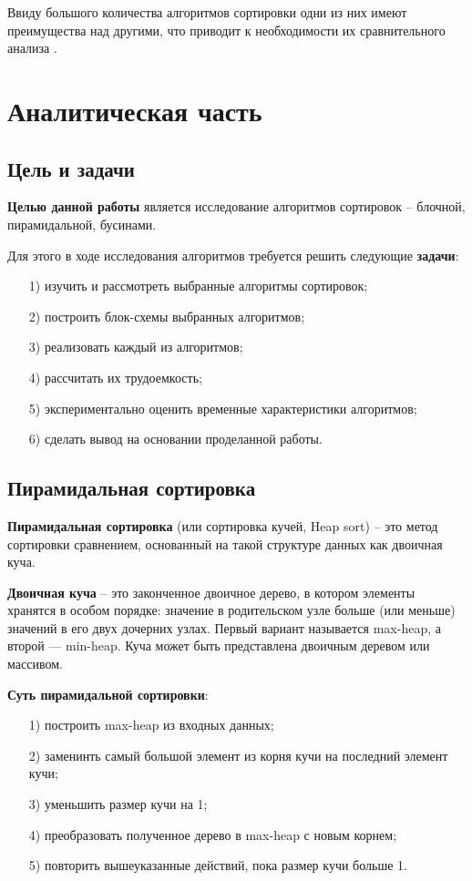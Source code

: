\documentclass[a4paper,14pt, unknownkeysallowed]{extreport}
\begin{document}
Ввиду большого количества алгоритмов сортировки одни из них имеют преимущества
над другими, что приводит к необходимости их сравнительного анализа
\cite{intro}.

	
\chapter{Аналитическая часть}
	
\section{Цель и задачи}
	
\textbf{Целью данной работы} является исследование алгоритмов сортировок -- блочной, пирамидальной, бусинами. 

Для этого в ходе исследования алгоритмов требуется решить следующие \textbf{задачи}:

\begin{enumerate}
	\item[1)] изучить и рассмотреть выбранные алгоритмы сортировок;
	\item[2)] построить блок-схемы выбранных алгоритмов;
	\item[3)] реализовать каждый из алгоритмов;
	\item[4)] рассчитать их трудоемкость;
	\item[5)] экспериментально оценить временные характеристики алгоритмов;
	\item[6)] сделать вывод на основании проделанной работы.
\end{enumerate}
	
	
\section{Пирамидальная сортировка}

\textbf{Пирамидальная сортировка} (или сортировка кучей, Heap sort) -- это метод сортировки сравнением, основанный на такой структуре данных как двоичная куча.

\textbf{Двоичная куча} -- это законченное двоичное дерево, в котором элементы хранятся в особом порядке: значение в родительском узле больше (или меньше) значений в его двух дочерних узлах. Первый вариант называется max-heap, а второй — min-heap. Куча может быть представлена двоичным деревом или массивом.

\textbf{Суть пирамидальной сортировки}:

\begin{enumerate}
	\item[1)] построить max-heap из входных данных;
	\item[2)] заменинть самый большой элемент из корня кучи на последний элемент кучи;
	\item[3)] уменьшить размер кучи на 1;
	\item[4)] преобразовать полученное дерево в max-heap с новым корнем;
	\item[5)] повторить вышеуказанные действий, пока размер кучи больше 1.
\end{enumerate}
	
\end{document}
